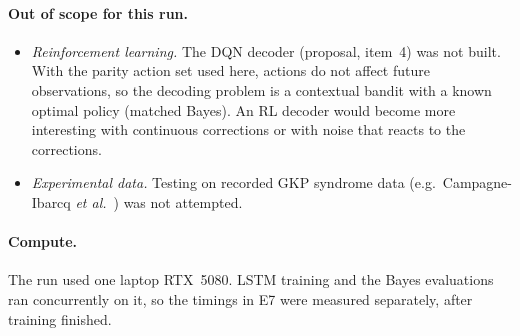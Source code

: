 \paragraph{Out of scope for this run.}
\begin{itemize}
  \item \emph{Reinforcement learning.} The DQN decoder (proposal, item~4)
    was not built. With the parity action set used here, actions do not
    affect future observations, so the decoding problem is a contextual
    bandit with a known optimal policy (matched Bayes). An RL decoder would
    become more interesting with continuous corrections or with noise that
    reacts to the corrections.
  \item \emph{Experimental data.} Testing on recorded GKP syndrome data
    (e.g.\ Campagne-Ibarcq \emph{et al.}~\cite{campagne}) was not attempted.
\end{itemize}

\paragraph{Compute.}
The run used one laptop RTX~5080. LSTM training and the Bayes evaluations ran
concurrently on it, so the timings in E7 were measured separately, after
training finished.
